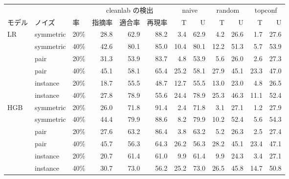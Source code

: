 \begin{tabular}{lllrrrrrrrrr}
\toprule
 & & & \multicolumn{3}{c}{cleanlab の検出} & \multicolumn{2}{c}{naive} & \multicolumn{2}{c}{random} & \multicolumn{2}{c}{topconf} \\
\cmidrule(lr){4-6} \cmidrule(lr){7-8} \cmidrule(lr){9-10} \cmidrule(lr){11-12}
モデル & ノイズ & 率 & 指摘率 & 適合率 & 再現率 & T & U & T & U & T & U \\
\midrule
LR & symmetric & 20\% & 28.8 & 62.9 & 88.2 & 3.4 & 62.9 & 4.2 & 26.6 & 1.7 & 27.6 \\
 & symmetric & 40\% & 42.6 & 80.1 & 85.0 & 10.4 & 80.1 & 12.2 & 51.3 & 5.7 & 53.9 \\
 & pair & 20\% & 31.3 & 53.9 & 83.7 & 4.8 & 53.9 & 5.6 & 26.0 & 2.6 & 27.3 \\
 & pair & 40\% & 45.1 & 58.1 & 65.4 & 25.2 & 58.1 & 27.9 & 45.1 & 23.3 & 47.0 \\
 & instance & 20\% & 18.7 & 55.5 & 48.7 & 12.7 & 55.5 & 13.0 & 23.0 & 4.8 & 26.5 \\
 & instance & 40\% & 27.8 & 78.9 & 55.6 & 24.4 & 78.9 & 25.3 & 46.3 & 11.1 & 52.4 \\
\addlinespace
HGB & symmetric & 20\% & 26.0 & 71.8 & 91.4 & 2.4 & 71.8 & 3.1 & 27.1 & 1.2 & 27.9 \\
 & symmetric & 40\% & 44.4 & 79.9 & 88.6 & 8.2 & 79.9 & 10.2 & 52.4 & 5.6 & 54.3 \\
 & pair & 20\% & 27.6 & 63.2 & 86.4 & 3.8 & 63.2 & 5.2 & 26.3 & 2.5 & 27.4 \\
 & pair & 40\% & 45.7 & 56.3 & 64.3 & 26.2 & 56.3 & 28.2 & 45.1 & 23.4 & 47.1 \\
 & instance & 20\% & 20.7 & 61.4 & 61.0 & 9.9 & 61.4 & 9.9 & 24.3 & 3.4 & 27.1 \\
 & instance & 40\% & 30.7 & 73.0 & 56.2 & 25.2 & 73.0 & 26.5 & 45.8 & 14.7 & 50.8 \\
\bottomrule
\end{tabular}
